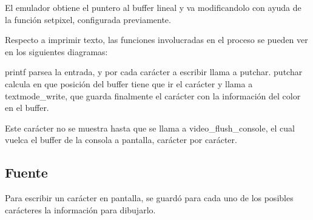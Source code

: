 El emulador obtiene el puntero al buffer lineal y va modificandolo con ayuda de la función setpixel, configurada previamente.

Respecto a imprimir texto, las funciones involucradas en el proceso se pueden ver en los siguientes diagramas:

printf parsea la entrada, y por cada carácter a escribir llama a putchar. putchar calcula en que posición del buffer tiene que ir el carácter y llama a textmode\_write, que guarda finalmente el carácter con la información del color en el buffer.


Este carácter no se muestra hasta que se llama a video\_flush\_console, el cual vuelca el buffer de la consola a pantalla, carácter por carácter.

\subsection{Fuente}
Para escribir un carácter en pantalla, se guardó para cada uno de los posibles carácteres la información para dibujarlo.

\setlength\fboxsep{10pt}
\setlength\fboxrule{0pt}

